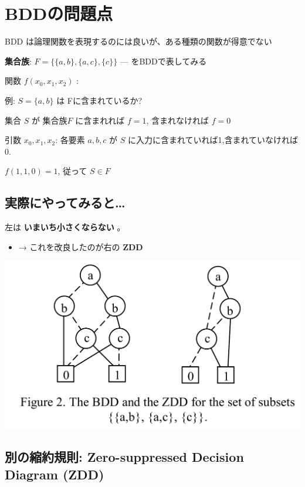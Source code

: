 \section{BDDの問題点}
\label{sec-5}

BDD は論理関数を表現するのには良いが、ある種類の関数が得意でない

\textbf{集合族}: $F=\{\{a,b\}, \{a,c\}, \{c\}\}$ --- をBDDで表してみる

関数 $f(x_0,x_1,x_2)$ :

例: $S=\{a,b\}$ は Fに含まれているか?

集合 $S$ が 集合族$F$ に含まれれば $f=1$, 含まれなければ $f=0$

引数 $x_0,x_1,x_2$: 各要素 $a,b,c$ が $S$ に入力に含まれていれば1,含まれていなければ0.

$f(1,1,0) = 1$, 従って $S \in F$

\subsection{実際にやってみると\ldots{}}
\label{sec-5-1}

左は \textbf{いまいち小さくならない} 。

\begin{alignright}
\begin{itemize}
\item → これを改良したのが右の \textbf{ZDD}
\end{itemize}
\end{alignright}

\includegraphics{img/static/bdd-zdd.png}


\subsection{別の縮約規則: Zero-suppressed Decision Diagram (ZDD)}
\label{sec-5-2}

